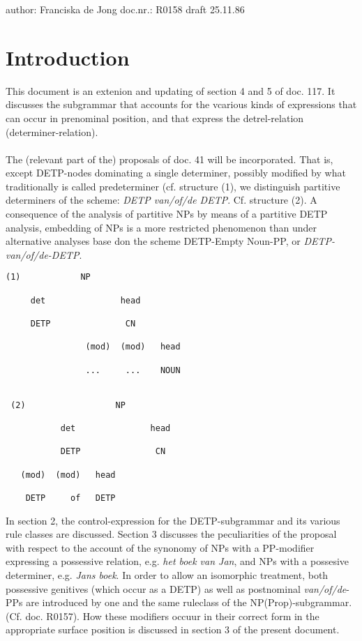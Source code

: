 
author: Franciska de Jong
doc.nr.: R0158
draft 25.11.86

\section{Introduction}

This document is an extenion and updating of section 4 and 5 of doc. 117.
It discusses the subgrammar that accounts for the vcarious kinds of 
expressions that can occur in prenominal position, and that express 
the detrel-relation (determiner-relation).
\\ \\
The (relevant part of the) proposals of doc. 41 will be incorporated. That 
is, except DETP-nodes dominating a single determiner, possibly modified by 
what traditionally is called predeterminer (cf. structure (1), 
we distinguish partitive 
determiners of the scheme: {\em DETP van/of/de DETP}. Cf. structure (2).
A consequence of the analysis of partitive NPs by means of a partitive
DETP analysis, embedding of NPs is a more restricted phenomenon than under
alternative analyses base don the scheme {DETP-Empty Noun-PP}, or 
{\em DETP-van/of/de-DETP}.

\begin{verbatim}
(1)            NP

     det               head

     DETP               CN

                (mod)  (mod)   head

                ...     ...    NOUN 


 (2)                  NP

           det               head

           DETP               CN

   (mod)  (mod)   head

    DETP     of   DETP
\end{verbatim}

In section 2, the control-expression for the DETP-subgrammar and its
various rule classes are discussed. 
Section 3 discusses the peculiarities of the
proposal with respect to the account of the synonomy 
of NPs with a PP-modifier expressing a possessive
relation, e.g. {\em het boek van Jan}, and NPs with a possesive determiner,
e.g. {\em Jans boek}. 
In order to allow an isomorphic treatment, both possessive genitives
(which occur as a DETP) as well as postnominal {\em van/of/de}-PPs are
introduced by one and the same ruleclass of the NP(Prop)-subgrammar.
(Cf. doc. R0157). How these modifiers occuur in their correct form in the
appropriate surface position is discussed in section 3 of the present 
document. 

